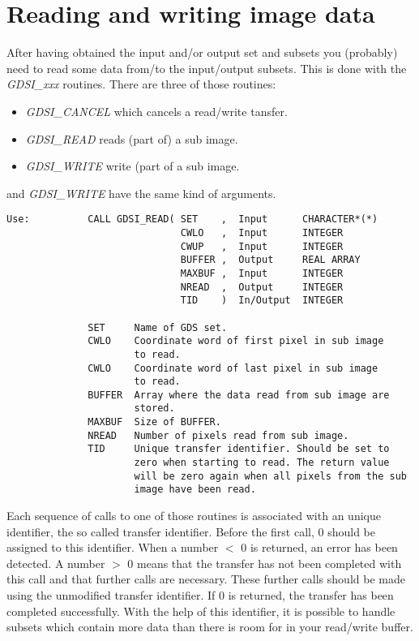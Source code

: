 \section{Reading and writing image data}

After having obtained the input and/or output set and subsets you
(probably) need to read some data from/to the input/output subsets.
This is done with the {\sl GDSI\_xxx\/} routines. There are three of
those routines:

\begin{itemize}

\item {\sl GDSI\_CANCEL\/} which cancels a
read/write tansfer.

\item {\sl GDSI\_READ\/} reads (part of) a sub
image.

\item {\sl GDSI\_WRITE\/} write (part of a sub
image.

\end{itemize}

 and {\sl GDSI\_WRITE} have the same kind of
arguments.

\begin{verbatim}
Use:          CALL GDSI_READ( SET    ,  Input      CHARACTER*(*)
                              CWLO   ,  Input      INTEGER
                              CWUP   ,  Input      INTEGER
                              BUFFER ,  Output     REAL ARRAY
                              MAXBUF ,  Input      INTEGER
                              NREAD  ,  Output     INTEGER
                              TID    )  In/Output  INTEGER

              SET     Name of GDS set.
              CWLO    Coordinate word of first pixel in sub image
                      to read.
              CWLO    Coordinate word of last pixel in sub image
                      to read.
              BUFFER  Array where the data read from sub image are
                      stored.
              MAXBUF  Size of BUFFER.
              NREAD   Number of pixels read from sub image.
              TID     Unique transfer identifier. Should be set to
                      zero when starting to read. The return value
                      will be zero again when all pixels from the sub
                      image have been read.
\end{verbatim}

Each sequence of calls to one of those routines is associated
with an unique identifier, the so called transfer identifier.  Before
the first call, 0 should be assigned to this identifier.  When a number
$<$ 0 is returned, an error has been detected.  A number $>$ 0 means
that the transfer has not been completed with this call and that further
calls are necessary.  These further calls should be made using the
unmodified transfer identifier.  If 0 is returned, the transfer has been
completed successfully.  With the help of this identifier, it is
possible to handle subsets which contain more data than there is room
for in your read/write buffer.

